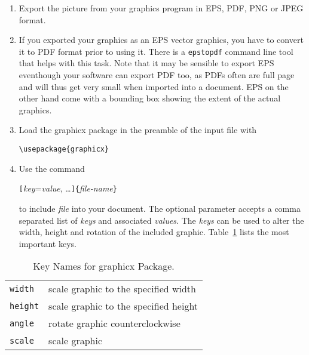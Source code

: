 \begin{enumerate}
\item Export the picture from your graphics program in EPS, PDF, PNG or JPEG format.
\item If you exported your graphics as an EPS vector graphics, you have to convert it to PDF format
prior to using it. There is a \texttt{epstopdf} command line tool that helps with this task.
Note that it may be sensible to export EPS eventhough your software can export PDF too, as PDFs often are full page and will
thus get very small when imported into a document. EPS on the other hand come with a bounding box showing the extent of the actual graphics.
\item Load the \textsf{graphicx} package in the preamble of the input
  file with
\begin{lscommand}
\verb|\usepackage{graphicx}|
\end{lscommand}
\item Use the command
\begin{lscommand}
\verb|[|\emph{key}=\emph{value}, \ldots\verb|]{|\emph{file-name}\verb|}|
\end{lscommand}
\noindent to include \emph{file} into your document. The optional parameter
accepts a comma separated list of \emph{keys} and associated
\emph{values}. The \emph{keys} can be used to alter the width, height
and rotation of the included graphic. Table~\ref{keyvals} lists the
most important keys.
\end{enumerate}

\begin{table}[tb]
\centering
\caption{Key Names for \textsf{graphicx} Package.}
\label{keyvals}
\begin{tabular}{@{}ll@{}}
  \toprule
\texttt{width}& scale graphic to the specified width\\
\texttt{height}& scale graphic to the specified height\\
\texttt{angle}& rotate graphic counterclockwise\\
\texttt{scale}& scale graphic \\
\bottomrule
\end{tabular}

\bigskip
\end{table}


